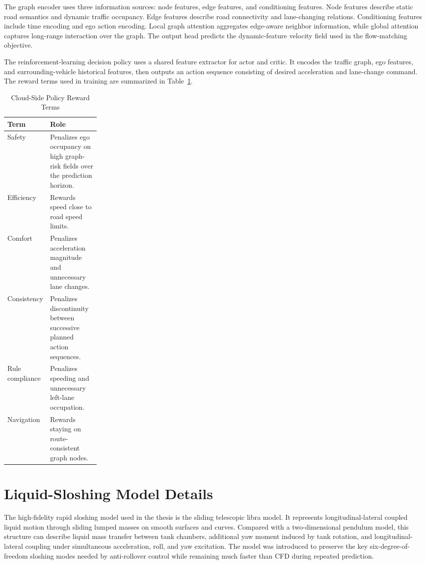 The graph encoder uses three information sources: node features, edge features, and conditioning features. Node features describe static road semantics and dynamic traffic occupancy. Edge features describe road connectivity and lane-changing relations. Conditioning features include time encoding and ego action encoding. Local graph attention aggregates edge-aware neighbor information, while global attention captures long-range interaction over the graph. The output head predicts the dynamic-feature velocity field used in the flow-matching objective.

The reinforcement-learning decision policy uses a shared feature extractor for actor and critic. It encodes the traffic graph, ego features, and surrounding-vehicle historical features, then outputs an action sequence consisting of desired acceleration and lane-change command. The reward terms used in training are summarized in Table~\ref{tab:appendix_reward}.

\begin{table}[t]
  \centering
  \caption{Cloud-Side Policy Reward Terms}
  \label{tab:appendix_reward}
  \begin{tabularx}{\linewidth}{p{0.22\linewidth}X}
    \toprule
    Term & Role \\
    \midrule
    Safety & Penalizes ego occupancy on high graph-risk fields over the prediction horizon. \\
    Efficiency & Rewards speed close to road speed limits. \\
    Comfort & Penalizes acceleration magnitude and unnecessary lane changes. \\
    Consistency & Penalizes discontinuity between successive planned action sequences. \\
    Rule compliance & Penalizes speeding and unnecessary left-lane occupation. \\
    Navigation & Rewards staying on route-consistent graph nodes. \\
    \bottomrule
  \end{tabularx}
\end{table}

\section{Liquid-Sloshing Model Details}

The high-fidelity rapid sloshing model used in the thesis is the sliding telescopic libra model. It represents longitudinal-lateral coupled liquid motion through sliding lumped masses on smooth surfaces and curves. Compared with a two-dimensional pendulum model, this structure can describe liquid mass transfer between tank chambers, additional yaw moment induced by tank rotation, and longitudinal-lateral coupling under simultaneous acceleration, roll, and yaw excitation. The model was introduced to preserve the key six-degree-of-freedom sloshing modes needed by anti-rollover control while remaining much faster than CFD during repeated prediction.

